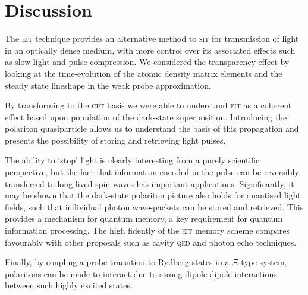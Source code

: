 \section{Discussion}
  \label{sec:polaritons_discussion}

  The \textsc{eit} technique provides an alternative method to \textsc{sit} for
  transmission of light in an optically dense medium, with more control over its
  associated effects such as slow light and pulse compression. We considered the
  transparency effect by looking at the time-evolution of the atomic density
  matrix elements and the steady state lineshape in the weak probe
  approximation.

  By transforming to the \textsc{cpt} basis we were able to understand
  \textsc{eit} as a coherent effect based upon population of the dark-state
  superposition. Introducing the polariton quasiparticle allows us to
  understand the basis of this propagation and presents the possibility of
  storing and retrieving light pulses.

  The ability to `stop' light is clearly interesting from a purely scientific
  perspective, but the fact that information encoded in the pulse can be
  reversibly transferred to long-lived spin waves has important applications.
  Significantly, it may be shown that the dark-state polariton picture also
  holds for quantised light fields, such that individual photon wave-packets can
  be stored and retrieved\cite{Fleischhauer2000}. This provides a mechanism for
  quantum memory, a key requirement for quantum information
  processing\cite{Lvovsky2009,Zhao2008}. The high fidently of the \textsc{eit}
  memory scheme compares favourably with other proposals such as cavity
  \textsc{qed} and photon echo techniques\cite{Moiseev2011,Kurnit1964}.

  Finally, by coupling a probe transition to Rydberg states in a $\Xi$-type
  system, polaritons can be made to interact due to strong dipole-dipole
  interactions between such highly excited states.\cite{Maxwell2013}

